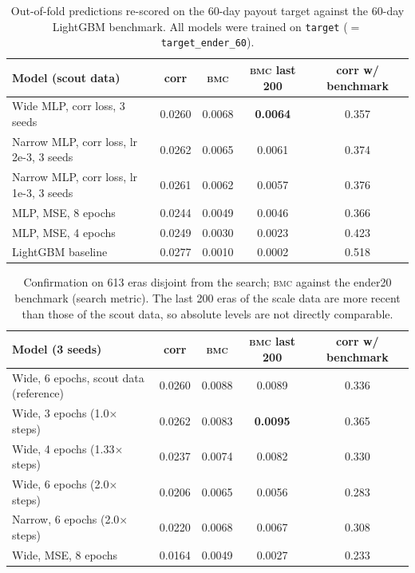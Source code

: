 \documentclass[11pt]{article}
\newcommand{\bmc}{\textsc{bmc}}
\begin{document}
\begin{table}[t]
\centering\small
\begin{tabular}{lcccc}
\toprule
Model (scout data) & corr & \bmc{} & \bmc{} last 200 & corr w/ benchmark \\
\midrule
Wide MLP, corr loss, 3 seeds & 0.0260 & 0.0068 & \textbf{0.0064} & 0.357 \\
Narrow MLP, corr loss, lr 2e-3, 3 seeds & 0.0262 & 0.0065 & 0.0061 & 0.374 \\
Narrow MLP, corr loss, lr 1e-3, 3 seeds & 0.0261 & 0.0062 & 0.0057 & 0.376 \\
MLP, MSE, 8 epochs & 0.0244 & 0.0049 & 0.0046 & 0.366 \\
MLP, MSE, 4 epochs & 0.0249 & 0.0030 & 0.0023 & 0.423 \\
LightGBM baseline & 0.0277 & 0.0010 & 0.0002 & 0.518 \\
\bottomrule
\end{tabular}
\caption{Out-of-fold predictions re-scored on the 60-day payout target against the 60-day
LightGBM benchmark. All models were trained on \texttt{target} ($=$ \texttt{target\_ender\_60}).}
\label{tab:ender60}
\end{table}

\begin{table}[t]
\centering\small
\begin{tabular}{lcccc}
\toprule
Model (3 seeds) & corr & \bmc{} & \bmc{} last 200 & corr w/ benchmark \\
\midrule
Wide, 6 epochs, scout data (reference) & 0.0260 & 0.0088 & 0.0089 & 0.336 \\
\midrule
Wide, 3 epochs (1.0$\times$ steps) & 0.0262 & 0.0083 & \textbf{0.0095} & 0.365 \\
Wide, 4 epochs (1.33$\times$ steps) & 0.0237 & 0.0074 & 0.0082 & 0.330 \\
Wide, 6 epochs (2.0$\times$ steps) & 0.0206 & 0.0065 & 0.0056 & 0.283 \\
Narrow, 6 epochs (2.0$\times$ steps) & 0.0220 & 0.0068 & 0.0067 & 0.308 \\
Wide, MSE, 8 epochs & 0.0164 & 0.0049 & 0.0027 & 0.233 \\
\bottomrule
\end{tabular}
\caption{Confirmation on 613 eras disjoint from the search; \bmc{} against the ender20 benchmark (search metric). The last 200 eras of the scale
data are more recent than those of the scout data, so absolute levels are not directly
comparable.}
\label{tab:scale}
\end{table}
\end{document}
